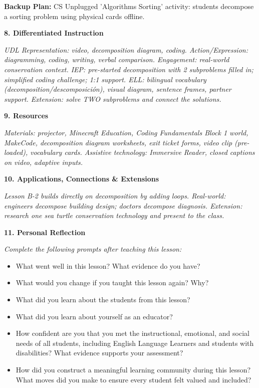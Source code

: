 \documentclass[11pt,letterpaper]{article}
\begin{document}
\textbf{Backup Plan: }CS Unplugged 'Algorithms Sorting' activity: students decompose a sorting problem using physical cards offline.

\textbf{8. Differentiated Instruction}

\textit{UDL Representation: video, decomposition diagram, coding. Action/Expression: diagramming, coding, writing, verbal comparison. Engagement: real-world conservation context. IEP: pre-started decomposition with 2 subproblems filled in; simplified coding challenge; 1:1 support. ELL: bilingual vocabulary (decomposition/descomposici{\'o}n), visual diagram, sentence frames, partner support. Extension: solve TWO subproblems and connect the solutions.}

\textbf{9. Resources}

\textit{Materials: projector, Minecraft Education, Coding Fundamentals Block 1 world, MakeCode, decomposition diagram worksheets, exit ticket forms, video clip (pre-loaded), vocabulary cards. Assistive technology: Immersive Reader, closed captions on video, adaptive inputs.}

\textbf{10. Applications, Connections \& Extensions}

\textit{Lesson B-2 builds directly on decomposition by adding loops. Real-world: engineers decompose building design; doctors decompose diagnosis. Extension: research one sea turtle conservation technology and present to the class.}

\textbf{11. Personal Reflection}

\textit{Complete the following prompts after teaching this lesson:}

\begin{itemize}
  \item What went well in this lesson? What evidence do you have?

  \item What would you change if you taught this lesson again? Why?

  \item What did you learn about the students from this lesson?

  \item What did you learn about yourself as an educator?

  \item How confident are you that you met the instructional, emotional, and social needs of all students, including English Language Learners and students with disabilities? What evidence supports your assessment?

  \item How did you construct a meaningful learning community during this lesson? What moves did you make to ensure every student felt valued and included?
\end{itemize}
\end{document}
